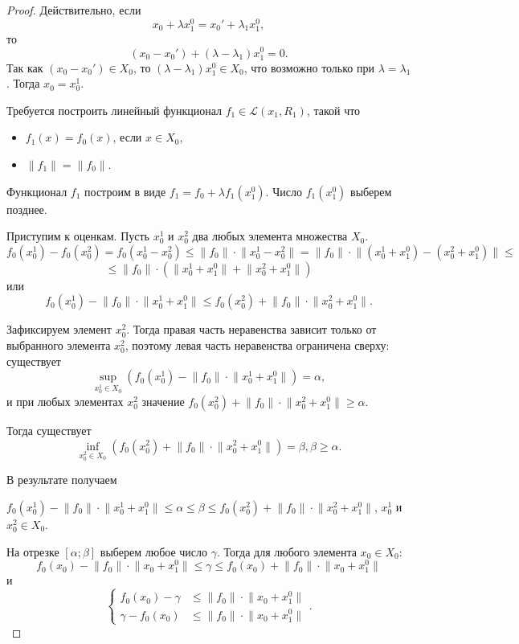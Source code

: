 \documentclass[12pt,a4paper,titlepage,oneside]{book}
\theoremstyle{definition}
\theoremstyle{plain}
\theoremstyle{break}
\theoremstyle{remark}
\theoremstyle{remark}
\theoremstyle{remark}
\theoremstyle{remark}
\theoremstyle{plain}
\theoremstyle{plain}
\begin{document}
\begin{proof}
Действительно, если $$x_0+\lambda x_1^0=x_0'+\lambda_1 x_1^0,$$ то $$(x_0-x_0')+(\lambda-\lambda_1)x_1^0=0.$$
Так как $(x_0-x_0') \in X_0$, то $(\lambda-\lambda_1)x_1^0 \in X_0$, что возможно только при $\lambda=\lambda_1$. Тогда $x_0=x_0^1$.

Требуется построить линейный функционал $f_1 \in \mathcal{L}(x_1, R_1)$, такой что
\begin{itemize}
	\item $f_1(x)=f_0(x)$, если $x\in X_0$,
	\item $\lVert f_1 \rVert=\lVert f_0 \rVert$.
\end{itemize}

Функционал $f_1$ построим в виде $f_1=f_0+\lambda f_1(x_1^0)$. Число $f_1(x_1^0)$ выберем позднее.

Приступим к оценкам. Пусть $x_0^1$ и $x_0^2$ два любых элемента множества $X_0$.
$$f_0(x_0^1)-f_0(x_0^2)=f_0(x_0^1-x_0^2) \leqslant \lVert f_0 \rVert \cdot \lVert x_0^1-x_0^2 \rVert = \lVert f_0 \rVert \cdot \lVert (x_0^1+x_1^0)-(x_0^2+x_1^0) \rVert \leqslant$$
$$ \leqslant \lVert f_0 \rVert \cdot (\lVert x_0^1+x_1^0 \rVert + \lVert x_0^2+x_1^0 \rVert) $$
или
$$f_0(x_0^1)-\lVert f_0 \rVert \cdot \lVert x_0^1+x_1^0 \rVert \leqslant f_0(x_0^2)+\lVert f_0 \rVert \cdot \lVert x_0^2+x_1^0 \rVert.$$

Зафиксируем элемент $x_0^2$. Тогда правая часть неравенства зависит только от выбранного элемента $x_0^2$, поэтому левая часть неравенства ограничена сверху: существует
$$\underset{x_0^1 \in X_0}{\sup}\left( f_0(x_0^1)-\lVert f_0 \rVert \cdot \lVert x_0^1+x_1^0 \rVert \right)=\alpha,$$
и при любых элементах $x_0^2$ значение $f_0(x_0^2)+\lVert f_0 \rVert \cdot \lVert x_0^2+x_1^0 \rVert \geqslant \alpha$.

Тогда существует $$\underset{x_0^2 \in X_0}{\inf}\left(f_0(x_0^2)+\lVert f_0 \rVert \cdot \lVert x_0^2+x_1^0 \rVert \right)=\beta, \beta \geqslant  \alpha .$$

В результате получаем
\begin{center}
$f_0(x_0^1)-\lVert f_0 \rVert \cdot \lVert x_0^1+x_1^0 \rVert \leqslant \alpha \leqslant \beta \leqslant f_0(x_0^2)+\lVert f_0 \rVert \cdot \lVert x_0^2+x_1^0 \rVert$, $x_0^1$ и $x_0^2 \in X_0$.
\end{center}

На отрезке $[\alpha ; \beta]$ выберем любое число $\gamma$. Тогда для любого элемента $x_0 \in X_0$:
$$f_0(x_0)-\lVert f_0 \rVert \cdot \lVert x_0+x_1^0 \rVert \leqslant \gamma \leqslant f_0(x_0)+\lVert f_0 \rVert \cdot \lVert x_0+x_1^0 \rVert$$
и
$$
\begin{cases}
    f_0(x_0)-\gamma &\leqslant \lVert f_0 \rVert \cdot \lVert x_0+x_1^0 \rVert\\
    \gamma - f_0(x_0) &\leqslant \lVert f_0 \rVert \cdot \lVert x_0+x_1^0 \rVert
\end{cases}.
$$


\end{proof}
\end{document}
